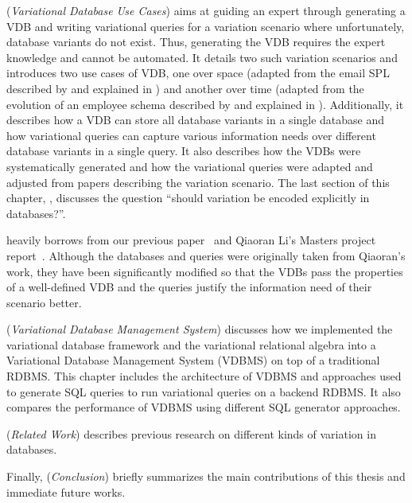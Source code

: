  (\emph{Variational Database Use Cases}) 
aims at guiding an expert through generating a VDB and writing
variational queries for a variation scenario where unfortunately,  database variants
do not exist. Thus, generating the VDB requires the expert knowledge and cannot
be automated. 
%
It details two such variation scenarios and introduces two use cases of VDB, one over space
(adapted from the email SPL described by \citet{Hall05} and explained in )
 and another over time (adapted from the evolution 
of an employee schema described by \citet{prima08Moon} and explained in ).
Additionally, it describes how a VDB can store all database variants in a single database and
 how variational queries can capture various information needs over different database variants
in a single query. It also describes how  the VDBs were systematically 
generated and how the variational queries
were adapted and adjusted from papers describing the variation scenario. 
%
The last section of this chapter, , discusses the question 
``should variation be encoded explicitly in databases?''.

 heavily borrows from our previous paper~\cite{ALW21vamos} and Qiaoran Li's Masters project report~\cite{Li19}. 
Although the databases and queries were originally taken from Qiaoran's work, they 
have been significantly modified  so that the VDBs pass the properties of a well-defined VDB and 
the queries justify the information need of their scenario better. 


 (\emph{Variational Database Management System}) discusses how we implemented 
the variational database framework and the variational relational
algebra into a Variational Database Management System (VDBMS) on top of
a traditional RDBMS. This chapter 
includes the architecture of VDBMS and approaches used to generate SQL
queries to run variational queries on a backend RDBMS. It also compares the
performance of VDBMS using different SQL generator approaches. 



 (\emph{Related Work}) describes previous research on different kinds of variation 
in databases.

Finally,  (\emph{Conclusion}) briefly summarizes the main contributions 
of this thesis and immediate future works. 

